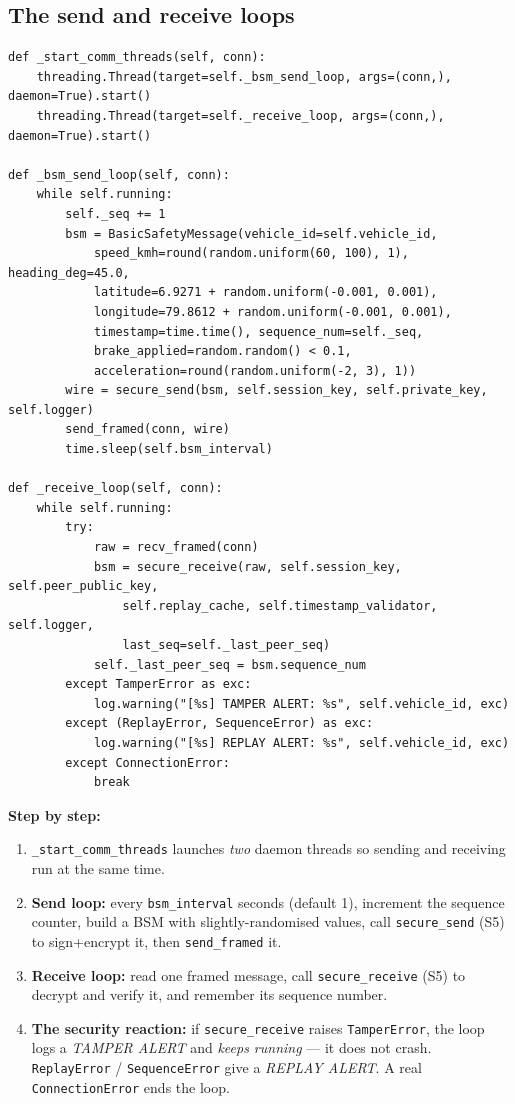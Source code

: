 \documentclass[11pt,a4paper]{report}
\begin{document}
\subsection{The send and receive loops}
\begin{lstlisting}[style=py,caption={vehicle\_node.py --- the two BSM loops (one per thread).}]
def _start_comm_threads(self, conn):
    threading.Thread(target=self._bsm_send_loop, args=(conn,), daemon=True).start()
    threading.Thread(target=self._receive_loop, args=(conn,), daemon=True).start()

def _bsm_send_loop(self, conn):
    while self.running:
        self._seq += 1
        bsm = BasicSafetyMessage(vehicle_id=self.vehicle_id,
            speed_kmh=round(random.uniform(60, 100), 1), heading_deg=45.0,
            latitude=6.9271 + random.uniform(-0.001, 0.001),
            longitude=79.8612 + random.uniform(-0.001, 0.001),
            timestamp=time.time(), sequence_num=self._seq,
            brake_applied=random.random() < 0.1,
            acceleration=round(random.uniform(-2, 3), 1))
        wire = secure_send(bsm, self.session_key, self.private_key, self.logger)
        send_framed(conn, wire)
        time.sleep(self.bsm_interval)

def _receive_loop(self, conn):
    while self.running:
        try:
            raw = recv_framed(conn)
            bsm = secure_receive(raw, self.session_key, self.peer_public_key,
                self.replay_cache, self.timestamp_validator, self.logger,
                last_seq=self._last_peer_seq)
            self._last_peer_seq = bsm.sequence_num
        except TamperError as exc:
            log.warning("[%s] TAMPER ALERT: %s", self.vehicle_id, exc)
        except (ReplayError, SequenceError) as exc:
            log.warning("[%s] REPLAY ALERT: %s", self.vehicle_id, exc)
        except ConnectionError:
            break
\end{lstlisting}
\textbf{Step by step:}
\begin{enumerate}
  \item \texttt{\_start\_comm\_threads} launches \emph{two} daemon threads so
        sending and receiving run at the same time.
  \item \textbf{Send loop:} every \texttt{bsm\_interval} seconds (default 1),
        increment the sequence counter, build a BSM with slightly-randomised
        values, call \texttt{secure\_send} (S5) to sign+encrypt it, then
        \texttt{send\_framed} it.
  \item \textbf{Receive loop:} read one framed message, call
        \texttt{secure\_receive} (S5) to decrypt and verify it, and remember its
        sequence number.
  \item \textbf{The security reaction:} if \texttt{secure\_receive} raises
        \texttt{TamperError}, the loop logs a \emph{TAMPER ALERT} and
        \emph{keeps running} --- it does not crash. \texttt{ReplayError} /
        \texttt{SequenceError} give a \emph{REPLAY ALERT}. A real
        \texttt{ConnectionError} ends the loop.
\end{enumerate}
\end{document}
